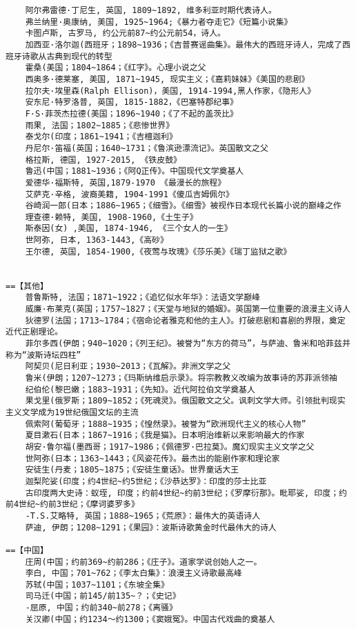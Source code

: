 \documentclass[UTF8]{../../RepresentationUniverse}
\begin{document}
\begin{lstlisting}
    阿尔弗雷德·丁尼生, 英国, 1809~1892, 维多利亚时期代表诗人。
    弗兰纳里·奥康纳, 美国, 1925~1964;《暴力者夺走它》《短篇小说集》
    卡图卢斯, 古罗马, 约公元前87~约公元前54，诗人。
    加西亚·洛尔迦(西班牙；1898~1936；《吉普赛谣曲集》。最伟大的西班牙诗人，完成了西班牙诗歌从古典到现代的转型
    霍桑(美国；1804~1864；《红字》。心理小说之父
    西奥多·德莱塞, 美国, 1871~1945, 现实主义；《嘉莉妹妹》《美国的悲剧》
    拉尔夫·埃里森(Ralph Ellison)，美国, 1914-1994,黑人作家，《隐形人》
    安东尼·特罗洛普, 英国, 1815-1882，《巴塞特郡纪事》
    F·S·菲茨杰拉德(美国；1896~1940；《了不起的盖茨比》
    雨果, 法国；1802~1885；《悲惨世界》
    泰戈尔(印度；1861~1941；《吉檀迦利》
    丹尼尔·笛福(英国；1640~1731；《鲁滨逊漂流记》。英国散文之父
    格拉斯, 德国, 1927-2015, 《铁皮鼓》
    鲁迅(中国；1881~1936；《阿Q正传》。中国现代文学奠基人
    爱德华·福斯特, 英国,1879-1970 《最漫长的旅程》
    艾萨克·辛格, 波裔美籍, 1904-1991《傻瓜吉姆佩尔》
    谷崎润一郎(日本；1886~1965；《细雪》。《细雪》被视作日本现代长篇小说的巅峰之作
    理查德·赖特, 美国, 1908-1960,《土生子》
    斯泰因(女) ,美国, 1874-1946, 《三个女人的一生》
    世阿弥, 日本, 1363-1443,《高砂》
    王尔德, 英国, 1854-1900,《夜莺与玫瑰》《莎乐美》《瑞丁监狱之歌》


==【其他】
    普鲁斯特, 法国；1871~1922；《追忆似水年华》：法语文学巅峰
    威廉·布莱克(英国；1757~1827；《天堂与地狱的婚姻》。英国第一位重要的浪漫主义诗人
    狄德罗(法国；1713~1784；《宿命论者雅克和他的主人》。打破悲剧和喜剧的界限，奠定近代正剧理论。
    菲尔多西(伊朗；940~1020；《列王纪》。被誉为“东方的荷马”，与萨迪、鲁米和哈菲兹并称为“波斯诗坛四柱”
    阿契贝(尼日利亚；1930~2013；《瓦解》。非洲文学之父
    鲁米(伊朗；1207~1273；《玛斯纳维启示录》。将宗教教义改编为故事诗的苏菲派领袖
    纪伯伦(黎巴嫩；1883~1931；《先知》。近代阿拉伯文学奠基人
    果戈里(俄罗斯；1809~1852；《死魂灵》。俄国散文之父。讽刺文学大师。引领批判现实主义文学成为19世纪俄国文坛的主流
    佩索阿(葡萄牙；1888~1935；《惶然录》。被誉为“欧洲现代主义的核心人物”
    夏目漱石(日本；1867~1916；《我是猫》。日本明治维新以来影响最大的作家
    胡安·鲁尔福(墨西哥；1917~1986；《佩德罗·巴拉莫》。魔幻现实主义文学之父
    世阿弥(日本；1363~1443；《风姿花传》。最杰出的能剧作家和理论家
    安徒生(丹麦；1805~1875；《安徒生童话》。世界童话大王
    迦梨陀娑(印度；约4世纪~约5世纪；《沙恭达罗》：印度的莎士比亚
    古印度两大史诗：蚁垤, 印度；约前4世纪~约前3世纪；《罗摩衍那》。毗耶娑, 印度；约前4世纪~约前3世纪；《摩诃婆罗多》
    -T.S.艾略特, 英国；1888~1965；《荒原》：最伟大的英语诗人
    萨迪, 伊朗；1208~1291；《果园》：波斯诗歌黄金时代最伟大的诗人
    
==【中国】
    庄周(中国；约前369~约前286；《庄子》。道家学说创始人之一。
    李白, 中国；701~762；《李太白集》：浪漫主义诗歌最高峰
    苏轼(中国；1037~1101；《东坡全集》
    司马迁(中国；前145/前135~？；《史记》
    -屈原, 中国；约前340~前278；《离骚》
    关汉卿(中国；约1234～约1300；《窦娥冤》。中国古代戏曲的奠基人


\end{lstlisting}
\end{document}
